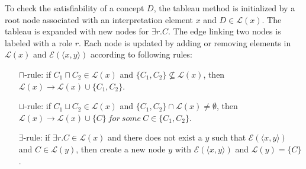 \documentclass{article}
\begin{document}
To check the satisfiability of a concept $D$, the tableau method is initialized by a root node associated with an interpretation element $x$ and $D\in \mathcal{L}(x)$. 
The tableau is expanded with new nodes for $\exists r.C$. The edge linking two nodes is  labeled with a role $r$. Each node is updated by 
adding or removing elements in $\mathcal{L}(x)$ and  $\mathcal{E}(\langle x,y\rangle)$ according to following rules:
\begin{itemize}
\item[$\sqcap$-rule:] if $C_1\sqcap C_2\in \mathcal{L}(x)$ and $\{C_1,C_2\}\nsubseteq \mathcal{L}(x)$, then $ \mathcal{L}(x)\rightarrow  \mathcal{L}(x)\cup \{C_1,C_2\}$.
\begin{center}
\end{center}
\item[$\sqcup$-rule:] if $C_1\sqcup C_2\in \mathcal{L}(x)$ and $\{C_1,C_2\} \cap \mathcal{L}(x)\neq \emptyset$, then $ \mathcal{L}(x)\rightarrow 
\mathcal{L}(x)\cup \{C\}~for ~some ~C\in\{C_1,C_2\}$.
\begin{center}
\end{center}
\item[$\exists$-rule:]  if $\exists r.C\in \mathcal{L}(x)$ and there does not exist a $y$ such that $\mathcal{E}(\langle x,y \rangle)$ and $C\in \mathcal{L}(y)$, then create a new node $y$ 
with $\mathcal{E}(\langle x,y\rangle)$ and $\mathcal{L}(y)=\{C\}$.
\begin{center}
\end{center}


\end{itemize}
\end{document}
